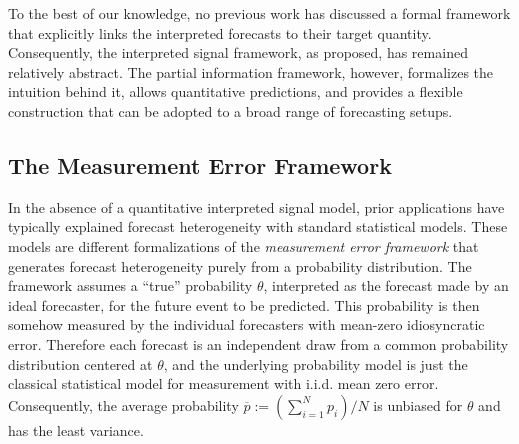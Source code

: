 \documentclass[12pt]{article}
\theoremstyle{definition}
\theoremstyle{definition}
\def\pb{\overline{p}}
\begin{document}


To the best of our knowledge, no previous work has discussed a formal framework that explicitly links the interpreted forecasts to their target quantity. Consequently, the interpreted signal framework, as proposed, has remained relatively abstract. 
The partial information framework, however, formalizes the intuition behind it, allows quantitative predictions, and provides a flexible construction that can be adopted to a broad range of forecasting setups. 

%

\subsection{The Measurement Error Framework}
\label{ss:measurement}
In the absence of a quantitative
interpreted signal model, prior applications have typically explained forecast heterogeneity  with standard statistical models. These models are different formalizations of  the \textit{measurement error framework} that generates forecast heterogeneity purely from a probability distribution. The framework assumes a ``true'' probability
$\theta$, interpreted as the forecast made by an ideal forecaster, for the future event to be predicted. This probability is then somehow measured by the individual forecasters with mean-zero idiosyncratic error.  Therefore each forecast is an independent draw from a common
probability distribution centered at $\theta$, and the underlying probability model is just the classical statistical model for measurement with i.i.d. mean zero error.  
Consequently, the average probability $\pb := \left(\sum_{i=1}^N
p_i \right) / N$ is unbiased for $\theta$ and has the least
variance. 
\end{document}
